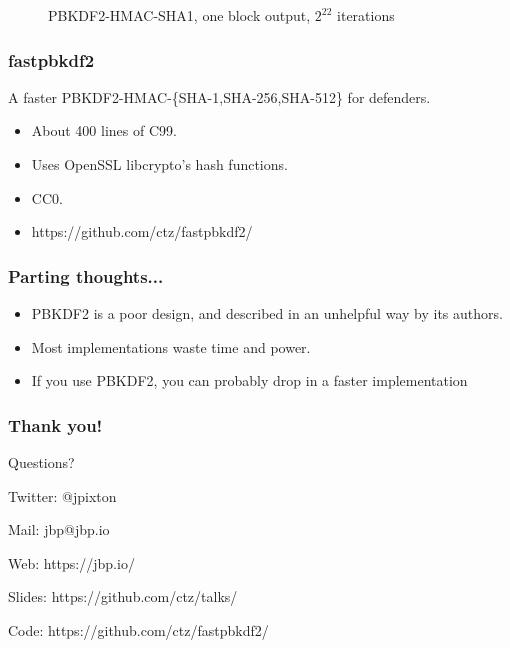 \documentclass{beamer}
\begin{document}
{\begin{figure}
  
  \caption{PBKDF2-HMAC-SHA1, one block output, $2^{22}$ iterations}
  \end{figure}

}

\frame
{
  \frametitle{fastpbkdf2}

  A faster PBKDF2-HMAC-\{SHA-1,SHA-256,SHA-512\} for defenders.

  \begin{itemize}
    \item<1-> About 400 lines of C99.
    \item<2-> Uses OpenSSL libcrypto's hash functions.
    \item<3-> CC0.
    \item<4-> https://github.com/ctz/fastpbkdf2/
  \end{itemize}
}

\frame
{
  \frametitle{Parting thoughts...}

  \begin{itemize}
    \item<1-> PBKDF2 is a poor design, and described in an unhelpful way by its authors.
    \item<2-> Most implementations waste time and power.
    \item<3-> If you use PBKDF2, you can probably drop in a faster implementation
  \end{itemize}
}

\frame
{
  \frametitle{Thank you!}
  Questions?

  \vspace{5em}

  Twitter: @jpixton

  Mail: jbp@jbp.io

  Web: https://jbp.io/

  Slides: https://github.com/ctz/talks/

  Code: https://github.com/ctz/fastpbkdf2/
}
\end{document}
